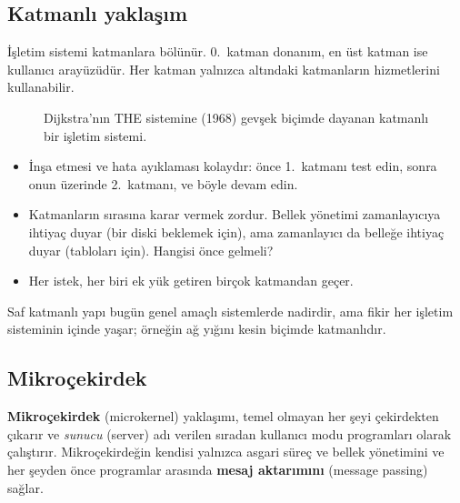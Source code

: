 \documentclass[11pt,a4paper]{article}
\newcommand{\term}[1]{\textbf{\color{mintdeep}#1}}
\begin{document}
\subsection{Katmanlı yaklaşım}

İşletim sistemi katmanlara bölünür. $0$.\ katman donanım, en üst katman ise kullanıcı arayüzüdür. Her katman yalnızca altındaki katmanların hizmetlerini kullanabilir.

\begin{figure}[H]
\centering
{}
\caption{Dijkstra'nın THE sistemine (1968) gevşek biçimde dayanan katmanlı bir işletim sistemi.}
\end{figure}

\begin{itemize}
  \item[\textcolor{mintdeep}{$+$}] İnşa etmesi ve hata ayıklaması kolaydır: önce 1.\ katmanı test edin, sonra onun üzerinde 2.\ katmanı, ve böyle devam edin.
  \item[\textcolor{red!60!black}{$-$}] Katmanların sırasına karar vermek zordur. Bellek yönetimi zamanlayıcıya ihtiyaç duyar (bir diski beklemek için), ama zamanlayıcı da belleğe ihtiyaç duyar (tabloları için). Hangisi önce gelmeli?
  \item[\textcolor{red!60!black}{$-$}] Her istek, her biri ek yük getiren birçok katmandan geçer.
\end{itemize}

Saf katmanlı yapı bugün genel amaçlı sistemlerde nadirdir, ama fikir her işletim sisteminin içinde yaşar; örneğin ağ yığını kesin biçimde katmanlıdır.

\subsection{Mikroçekirdek}
\label{sec:micro}

\term{Mikroçekirdek} (microkernel) yaklaşımı, temel olmayan her şeyi çekirdekten çıkarır ve \emph{sunucu} (server) adı verilen sıradan kullanıcı modu programları olarak çalıştırır. Mikroçekirdeğin kendisi yalnızca asgari süreç ve bellek yönetimini ve her şeyden önce programlar arasında \term{mesaj aktarımını} (message passing) sağlar.
\end{document}
